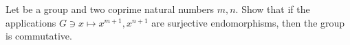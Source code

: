 Let be a group and two coprime natural numbers $ m,n. $ Show that if the applications $ G\ni x\mapsto x^{m+1},x^{n+1} $ are surjective endomorphisms, then the group is commutative.